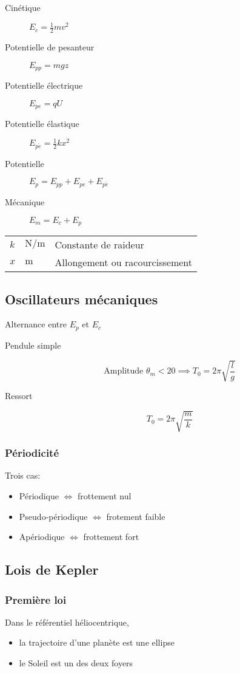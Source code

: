 \documentclass{article}
\newcommand{\deftable}[2]{%
\begin{table}[h]
    \centering
    \begin{tabular}{llp{100mm}}%
        #1
    \end{tabular}
    \label{tab:#2_units}
\end{table}%
}
\newcommand{\deftablevar}[3]{%
    $#1$ & $\si{#2}$ & #3 \\
}
\begin{document}
\begin{description}
    \item[Cinétique] $E_c = \frac{1}{2}mv^2$
    \item[Potentielle de pesanteur] $E_{pp} = mgz$
    \item[Potentielle électrique] $E_{pe} = qU$
    \item[Potentielle élastique]  $E_{p\acute e} = \frac{1}{2}kx^2$
    \item[Potentielle]  $E_p = E_{pp} + E_{pe} + E_{p\acute e}$
    \item[Mécanique] $E_m = E_c + E_p$
\end{description}

\deftable{
    \deftablevar{k}{\newton\per\meter}{Constante de raideur}
    \deftablevar{x}{\meter}{Allongement ou racourcissement}
}{}

\subsection{Oscillateurs mécaniques}

Alternance entre $E_p$ et $E_c$

\begin{description}
    \item[Pendule simple] $$\text{Amplitude } \theta_m < 20 \implies T_0 = 2\pi \sqrt{\frac{l}{g}}$$
    \item[Ressort] $$T_0 = 2\pi \sqrt{\frac{m}{k}}$$
\end{description}

\subsubsection{Périodicité}

Trois cas:

\begin{itemize}
    \item Périodique $\iff$ frottement nul
    \item Pseudo-périodique $\iff$ frotement faible
    \item Apériodique $\iff$ frottement fort
\end{itemize}

\subsection{Lois de Kepler}

\subsubsection{Première loi}
Dans le référentiel héliocentrique, 
\begin{itemize}
    \item la trajectoire d'une planète est une ellipse 
    \item le Soleil est un des deux foyers
\end{itemize}
\end{document}

